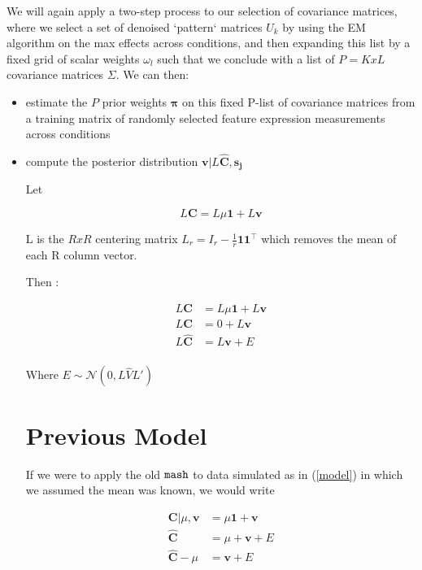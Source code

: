 \documentclass[11pt, oneside]{article}   	%
\newcommand{\Norm}{{\mathcal{N}}} %
\newcommand{\ceff}{\bm{C}}
\newcommand{\chat}{\bm{\hat{C}}}
\newcommand{\vb}{\bm{v}}
\def\mash{{\tt mash}}
\begin{document}
We will again apply a two-step process to our selection of covariance matrices, where we select a set of denoised `pattern` matrices $U_{k}$ by using the EM algorithm on the max effects across conditions,
and then expanding this list by a fixed grid of scalar weights $\omega_{l}$ such that we conclude with a list of $P=KxL$ covariance matrices $\Sigma$. We can then:
\begin{itemize}
\item estimate the $P$ prior weights $\bm\pi$ on this fixed P-list of covariance matrices from a training matrix of randomly selected feature expression measurements across conditions
\item compute the posterior distribution $\vb | L \chat, \bm{s_{j}}$

Let 

\begin{equation}
L \ceff = L \mu \bm{1} + L \vb
\end{equation}

L is the $RxR$ centering matrix $L_{r}=I_{r}-{\tfrac  {1}{r}}{\mathbf  {1}}{\mathbf  {1}}^{\top }$ which removes the mean of each R column vector.

Then :

\begin{equation}
\label{model}
\begin{aligned}
L \ceff &= L \mu \bm{1}+ L \vb \\
L \ceff &= 0 + L \vb \\
L \chat &= L \vb + E \\
\end{aligned}
\end{equation}



Where $E \sim \Norm (0, L\hat{V} L')$


\section{Previous Model}

If we were to apply the old $\mash$ to data simulated as in (\ref{model}) in which we assumed the mean was known, we would write

\begin{equation}
\begin{aligned}
\ceff | \mu, \vb  &= \mu \bm{1} + \vb \\
\chat &= \mu + \vb + E \\
\chat - \mu &= \vb + E \\
\end{aligned}
\end{equation}


\end{itemize}
\end{document}
